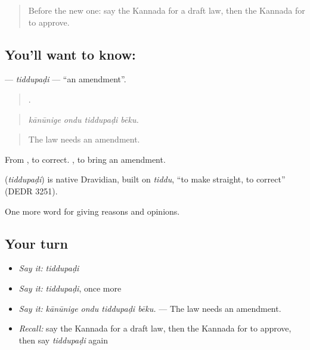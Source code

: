\label{lesson:KA-C396-tiddupadi}



\begin{quote}
Before the new one: say the Kannada for a draft law, then the Kannada for to approve.
\end{quote}

\subsection*{You'll want to know: }
\textbf{} — \emph{tiddupaḍi} — \textquotedblleft{}an amendment\textquotedblright{}.

\begin{quote}
   .
\end{quote}

\begin{quote}
\emph{kānūnige ondu tiddupaḍi bēku.}
\end{quote}

\begin{quote}
The law needs an amendment.
\end{quote}

From , to correct.  , to bring an amendment.

\begin{cousinweb}
\textbf{} (\emph{tiddupaḍi}) is native Dravidian, built on \emph{tiddu}, \textquotedblleft{}to make straight, to correct\textquotedblright{} (DEDR 3251).
\end{cousinweb}

\begin{grammarlens}[title={What you've built}]
One more word for giving reasons and opinions.
\end{grammarlens}

\subsection*{Your turn}
\begin{itemize}
\raggedright
  \item \emph{Say it:} \emph{tiddupaḍi}
  \item \emph{Say it:} \emph{tiddupaḍi}, once more
  \item \emph{Say it:} \emph{kānūnige ondu tiddupaḍi bēku.} — The law needs an amendment.
  \item \emph{Recall:} say the Kannada for a draft law, then the Kannada for to approve, then say \emph{tiddupaḍi} again
\end{itemize}

